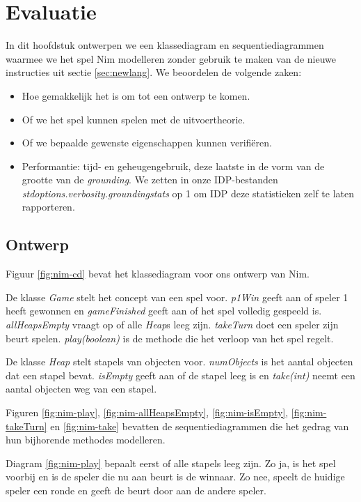 \chapter{Evaluatie}\label{sec:evaluatie}

In dit hoofdstuk ontwerpen we een klassediagram en sequentiediagrammen waarmee we het spel Nim modelleren zonder gebruik te maken van de nieuwe instructies uit sectie \ref{sec:newlang}. We beoordelen de volgende zaken:

\begin{itemize}
	\item Hoe gemakkelijk het is om tot een ontwerp te komen.
	\item Of we het spel kunnen spelen met de uitvoertheorie.
	\item Of we bepaalde gewenste eigenschappen kunnen verifi\"eren.
	\item Performantie: tijd- en geheugengebruik, deze laatste in de vorm van de grootte van de \textit{grounding}\cite{DeCatBroes2014PLaa}. We zetten in onze IDP-bestanden \textit{stdoptions.verbosity.groundingstats} op 1 om IDP deze statistieken zelf te laten rapporteren.
\end{itemize}

\section{Ontwerp}

Figuur \ref{fig:nim-cd} bevat het klassediagram voor ons ontwerp van Nim.

De klasse \textit{Game} stelt het concept van een spel voor. \textit{p1Win} geeft aan of speler 1 heeft gewonnen en \textit{gameFinished} geeft aan of het spel volledig gespeeld is. \textit{allHeapsEmpty} vraagt op of alle \textit{Heap}s leeg zijn. \textit{takeTurn} doet een speler zijn beurt spelen. \textit{play(boolean)} is de methode die het verloop van het spel regelt.

De klasse \textit{Heap} stelt stapels van objecten voor. \textit{numObjects} is het aantal objecten dat een stapel bevat. \textit{isEmpty} geeft aan of de stapel leeg is en \textit{take(int)} neemt een aantal objecten weg van een stapel.

Figuren \ref{fig:nim-play}, \ref{fig:nim-allHeapsEmpty}, \ref{fig:nim-isEmpty}, \ref{fig:nim-takeTurn} en \ref{fig:nim-take} bevatten de sequentiediagrammen die het gedrag van hun bijhorende methodes modelleren.

Diagram \ref{fig:nim-play} bepaalt eerst of alle stapels leeg zijn. Zo ja, is het spel voorbij en is de speler die nu aan beurt is de winnaar. Zo nee, speelt de huidige speler een ronde en geeft de beurt door aan de andere speler.

